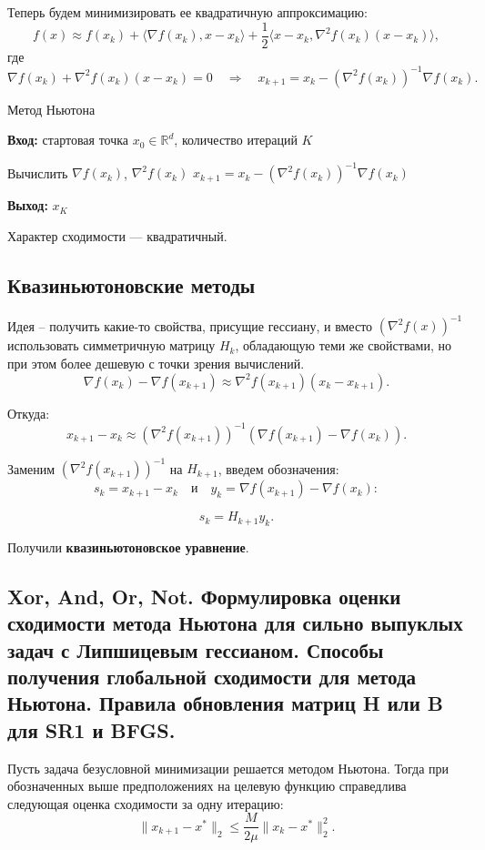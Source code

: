 Теперь будем минимизировать ее квадратичную аппроксимацию:
$$ f(x) \approx f(x_k) + \langle \nabla f(x_k), x - x_k \rangle + \frac{1}{2} \langle x - x_k, \nabla^2 f(x_k) (x - x_k) \rangle, $$
где
$$ \nabla f(x_k) + \nabla^2 f(x_k)(x - x_k) = 0 \quad \Rightarrow \quad x_{k+1} = x_k - (\nabla^2 f(x_k))^{-1} \nabla f(x_k). $$

\begin{algorithm}[H]
    \caption{Метод Ньютона}
    \textbf{Вход:} стартовая точка $x_0 \in \mathbb{R}^d$, количество итераций $K$
    \begin{algorithmic}[1]
        \State Вычислить $\nabla f(x_k)$, $\nabla^2 f(x_k)$
        \State $x_{k+1} = x_k - (\nabla^2 f(x_k))^{-1} \nabla f(x_k)$
        \EndFor
    \end{algorithmic}
    \textbf{Выход:} $x_K$
\end{algorithm}

Характер сходимости --- квадратичный.

\subsection*{Квазиньютоновские методы}

Идея – получить какие-то свойства, присущие гессиану, и вместо $(\nabla^2 f(x))^{-1}$ использовать симметричную матрицу $H_k$,
обладающую теми же свойствами, но при этом более дешевую с точки зрения вычислений.
$$ \nabla f(x_k) - \nabla f(x_{k+1}) \approx \nabla^2 f(x_{k+1})(x_k - x_{k+1}). $$

Откуда:
$$ x_{k+1} - x_k \approx (\nabla^2 f(x_{k+1}))^{-1} (\nabla f(x_{k+1}) - \nabla f(x_k)). $$

Заменим $(\nabla^2 f(x_{k+1}))^{-1}$ на $H_{k+1}$, введем обозначения:
$$ s_k = x_{k+1} - x_k \quad \text{и} \quad y_k = \nabla f(x_{k+1}) - \nabla f(x_k): $$

$$ s_k = H_{k+1} y_k. $$

Получили \textbf{квазиньютоновское уравнение}.

\subsection{Xor, And, Or, Not. Формулировка оценки сходимости метода Ньютона для сильно выпуклых задач с Липшицевым гессианом.
    Способы получения глобальной сходимости для метода Ньютона. Правила обновления матриц H или B для SR1 и BFGS.}

\begin{theorem}
    Пусть задача безусловной минимизации решается методом Ньютона.
    Тогда при обозначенных выше предположениях на целевую функцию справедлива следующая оценка сходимости за одну итерацию:
    $$ \| x_{k+1} - x^* \|_2 \leq \frac{M}{2\mu} \| x_k - x^* \|_2^2. $$
\end{theorem}

